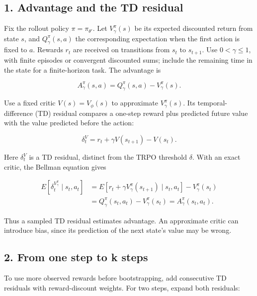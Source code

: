 \documentclass[11pt, a4paper]{article}
\begin{document}
\subsection*{1. Advantage and the TD residual}

Fix the rollout policy $\pi=\pi_{\theta'}$. Let $V_\gamma^\pi(s)$ be its expected discounted return from state $s$, and $Q_\gamma^\pi(s,a)$ the corresponding expectation when the first action is fixed to $a$. Rewards $r_t$ are received on transitions from $s_t$ to $s_{t+1}$. Use $0<\gamma\le 1$, with finite episodes or convergent discounted sums; include the remaining time in the state for a finite-horizon task. The advantage is

\begin{equation}\label{eq:ppo-gae-advantage}
    A_\gamma^\pi(s,a)=Q_\gamma^\pi(s,a)-V_\gamma^\pi(s).
\end{equation}

Use a fixed critic $V(s)=V_\phi(s)$ to approximate $V_\gamma^\pi(s)$. Its temporal-difference (TD) residual compares a one-step reward plus predicted future value with the value predicted before the action:

\begin{equation}\label{eq:ppo-gae-td-residual}
    \delta_t^V=r_t+\gamma V(s_{t+1})-V(s_t).
\end{equation}

Here $\delta_t^V$ is a TD residual, distinct from the TRPO threshold $\delta$. With an exact critic, the Bellman equation gives

\begin{align}
    E[\delta_t^{V_\gamma^\pi}\mid s_t,a_t]
    &=E[r_t+\gamma V_\gamma^\pi(s_{t+1})\mid s_t,a_t]-V_\gamma^\pi(s_t)\nonumber\\
    &=Q_\gamma^\pi(s_t,a_t)-V_\gamma^\pi(s_t)
      =A_\gamma^\pi(s_t,a_t).\label{eq:ppo-gae-td-expectation}
\end{align}

Thus a sampled TD residual estimates advantage. An approximate critic can introduce bias, since its prediction of the next state's value may be wrong.

\subsection*{2. From one step to k steps}

To use more observed rewards before bootstrapping, add consecutive TD residuals with reward-discount weights. For two steps, expand both residuals:
\end{document}
